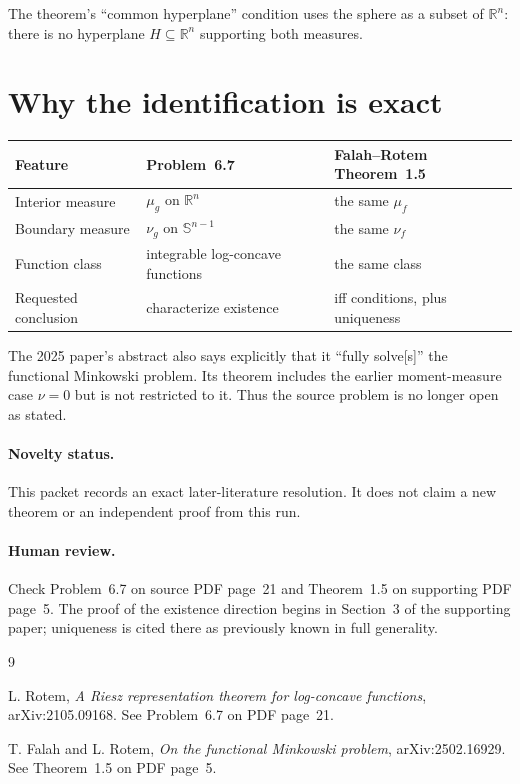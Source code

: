 \documentclass[11pt]{article}
\newcommand{\R}{\mathbb R}
\newcommand{\Sph}{\mathbb S}
\begin{document}
The theorem's ``common hyperplane'' condition uses the sphere as a subset of
$\R^n$: there is no hyperplane $H\subseteq\R^n$ supporting both measures.

\section*{Why the identification is exact}
\begin{center}
\small
\begin{tabularx}{\textwidth}{@{}p{}XX@{}}
\toprule
Feature & Problem~6.7 & Falah--Rotem Theorem~1.5 \\
\midrule
Interior measure & $\mu_g$ on $\R^n$ & the same $\mu_f$ \\
Boundary measure & $\nu_g$ on $\Sph^{n-1}$ & the same $\nu_f$ \\
Function class & integrable log-concave functions & the same class \\
Requested conclusion & characterize existence & iff conditions, plus uniqueness \\
\bottomrule
\end{tabularx}
\end{center}

The 2025 paper's abstract also says explicitly that it ``fully solve[s]'' the
functional Minkowski problem.  Its theorem includes the earlier moment-measure
case $\nu=0$ but is not restricted to it.  Thus the source problem is no
longer open as stated.

\paragraph{Novelty status.}
This packet records an exact later-literature resolution.  It does not claim
a new theorem or an independent proof from this run.

\paragraph{Human review.}
Check Problem~6.7 on source PDF page~21 and Theorem~1.5 on supporting PDF
page~5.  The proof of the existence direction begins in Section~3 of the
supporting paper; uniqueness is cited there as previously known in full
generality.

\begin{thebibliography}{9}
\raggedright
{}
L. Rotem,
\emph{A Riesz representation theorem for log-concave functions},
arXiv:2105.09168.  See Problem~6.7 on PDF page~21.

T. Falah and L. Rotem,
\emph{On the functional Minkowski problem},
arXiv:2502.16929.  See Theorem~1.5 on PDF page~5.
\end{thebibliography}
\end{document}
